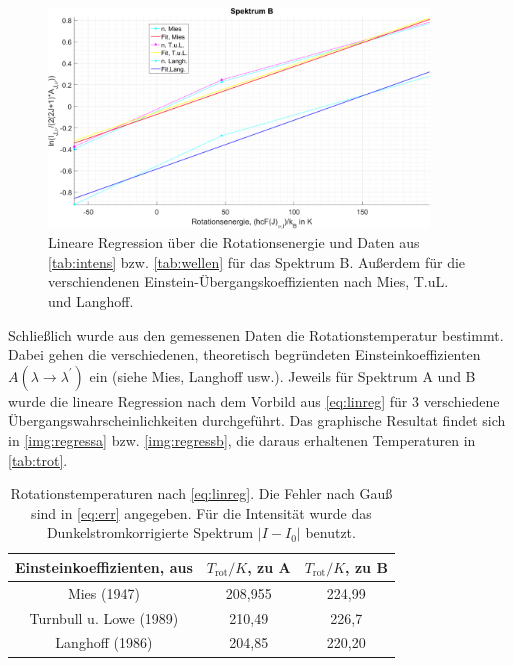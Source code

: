 \documentclass[numbers=noenddot,a4paper,notitlepage,twoside,BCOR15mm]{scrartcl}
\newcommand{\ix}[1]{_\text{#1}}
\begin{document}
				\begin{figure}
					\centering
					\includegraphics[width=0.9\textwidth]{lin_reg_b.png}
					\caption{Lineare Regression über die Rotationsenergie und Daten aus \autoref{tab:intens} bzw. \autoref{tab:wellen} für das Spektrum B. Außerdem für die verschiendenen Einstein-Übergangskoeffizienten nach Mies, T.uL. und Langhoff.}
					\label{img:regressb}
				\end{figure}

			Schließlich wurde aus den gemessenen Daten die Rotationstemperatur bestimmt. Dabei gehen die verschiedenen, theoretisch begründeten Einsteinkoeffizienten $A(\lambda\rightarrow\lambda^\prime)$ ein (siehe Mies, Langhoff usw.). Jeweils für Spektrum A und B wurde die lineare Regression nach dem Vorbild aus \autoref{eq:linreg} für 3 verschiedene Übergangswahrscheinlichkeiten durchgeführt. Das graphische Resultat findet sich in \autoref{img:regressa} bzw. \autoref{img:regressb}, die daraus erhaltenen Temperaturen in \autoref{tab:trot}.

				\begin{table}
					\centering
					\begin{tabular}{c|c|c}
						Einsteinkoeffizienten, aus \cite{EMAUGreifswaldOHRot} & $T\ix{rot}/\unit{K}$, zu A & $T\ix{rot}/\unit{K}$, zu B\\
						\hline Mies (1947) & 208,955 & 224,99 \\
						\hline Turnbull u. Lowe (1989) & 210,49& 226,7 \\
						\hline Langhoff (1986) & 204,85 & 220,20
					\end{tabular}
					\caption{Rotationstemperaturen nach \autoref{eq:linreg}. Die Fehler nach Gauß sind in \autoref{eq:err} angegeben. Für die Intensität wurde das Dunkelstromkorrigierte Spektrum $|I-I\ix{0}|$ benutzt.}
					\label{tab:trot}
				\end{table}
\end{document}
